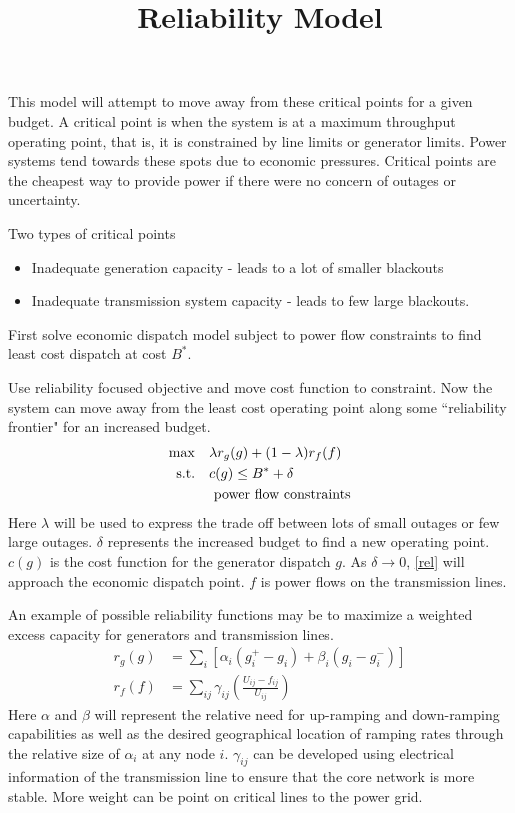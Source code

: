 

\title{ Reliability Model }


This model will attempt to move away from these critical points for a given budget.  A critical point is when the system is at a maximum throughput operating point, that is, it is constrained by line limits or generator limits.  Power systems tend towards these spots due to economic pressures.  Critical points are the cheapest way to provide power if there were no concern of outages or uncertainty.

Two types of critical points
\begin{itemize}
\item Inadequate generation capacity - leads to a lot of smaller blackouts
\item Inadequate transmission system capacity - leads to few large blackouts.
\end{itemize}

First solve economic dispatch model subject to power flow constraints to find least cost dispatch at cost $B^*$.

Use reliability focused objective and move cost function to constraint.  Now the system can move away from the least cost operating point along some ``reliability frontier" for an increased budget.
\begin{subequations} \label{rel}
\begin{align} 
\max	& \hspace{10px} \lambda r_g(g) + (1-\lambda) r_f(f) \\
\mbox{s.t.}	& \hspace{10px}c(g) \le B^* + \delta	\\
  &	\hspace{10px}\mbox{ power flow constraints} 
\end{align}
\end{subequations}
Here $\lambda$ will be used to express the trade off between lots of small outages or few large outages.  $\delta$ represents the increased budget to find a new operating point.  $c(g)$ is the cost function for the generator dispatch $g$.  As $\delta \rightarrow 0$, \ref{rel} will approach the economic dispatch point. $f$ is power flows on the transmission lines.  

An example of possible reliability functions may be to maximize a weighted excess capacity for generators and transmission lines.
\begin{align}
r_g(g) &= \sum_i \left[ \alpha_i (g_i^+ - g_i ) + \beta_i (g_i - g_i^-) \right]\\
r_f(f) &= \sum_{ij} \gamma_{ij} \left( \frac{U_{ij} - f_{ij}}{U_{ij}} \right)
\end{align}
Here $\alpha$ and $\beta$ will represent the relative need for up-ramping and down-ramping capabilities as well as the desired geographical location of ramping rates through the relative size of $\alpha_i$ at any node $i$.  $\gamma_{ij}$ can be developed using electrical information of the transmission line to ensure that the core network is more stable.  More weight can be point on critical lines to the power grid.



